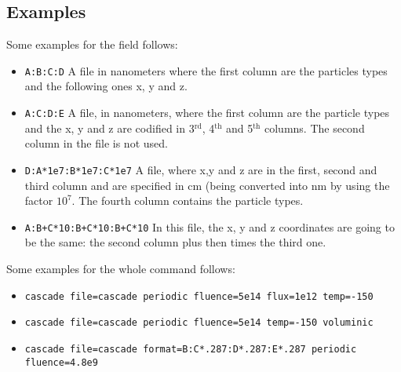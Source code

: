 \subsection {Examples}

Some examples for the  field follows:
\begin{itemize}
\item \verb+A:B:C:D+ A file in nanometers where the first column are the particles types and the following ones x, y and z.
\item \verb+A:C:D:E+ A file, in nanometers, where the first column are the particle types and the x, y and z are codified in 3$^\mathrm{rd}$, 4$^\mathrm{th}$ and 5$^\mathrm{th}$ columns. The second column in the file is not used.
\item \verb+D:A*1e7:B*1e7:C*1e7+ A file, where x,y and z are in the first, second and third column and are specified in cm (being converted into nm by using the factor $10^7$. The fourth column contains the particle types.
\item \verb-A:B+C*10:B+C*10:B+C*10- In this file, the x, y and z coordinates are going to be the same: the second column plus then times the third one.
\end{itemize}

Some examples for the whole command follows:
\begin{itemize}
\item \verb+cascade file=cascade periodic fluence=5e14 flux=1e12 temp=-150+
\item \verb+cascade file=cascade periodic fluence=5e14 temp=-150 voluminic+
\item \verb-cascade file=cascade format=B:C*.287:D*.287:E*.287 periodic fluence=4.8e9-
\end{itemize}
